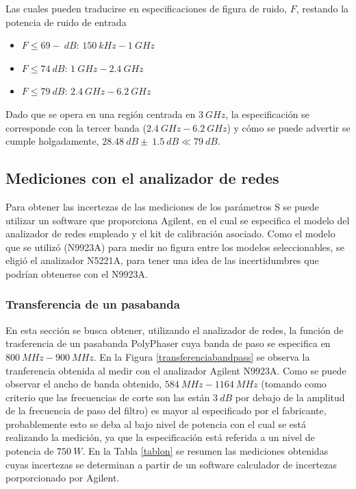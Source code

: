 \documentclass[a4paper,10pt]{article}
\begin{document}
		\indent Las cuales pueden traducirse en especificaciones de figura de 
		ruido, $F$, restando la potencia de ruido de entrada
		
		\begin{itemize}
			\item $F\leq69-~dB$: 	$150~kHz-1~GHz$
			\item $F\leq74~dB$:	 $1~GHz-2.4~GHz$
			\item $F\leq79~dB$:	 $2.4~GHz-6.2~GHz$
		\end{itemize}
		
		\indent Dado que se opera en una regi\'on centrada en $3~GHz$, la 
		especificaci\'on se corresponde con la tercer banda ($2.4~GHz-6.2~GHz$) 
		y c\'omo se puede advertir se cumple holgadamente, 
		$28.48~dB\pm~1.5~dB\ll79~dB$.
		
	\subsection{Mediciones con el analizador de redes}
	Para obtener las incertezas de las mediciones de los par\'ametros S se puede utilizar un software que proporciona Agilent, en el cual se especifica el modelo del analizador de redes empleado y el kit de calibraci\'on asociado. Como el modelo que se utiliz\'o (N9923A) para medir no figura entre los modelos seleccionables, se eligi\'o el analizador N5221A, para tener una idea de las incertidumbres que podr\'ian obtenerse con el N9923A.
		\subsubsection{Transferencia de un pasabanda}
		\indent En esta secci\'on se busca obtener, utilizando el analizador de 
		redes, la funci\'on de trasferencia de un pasabanda PolyPhaser cuya 
		banda de paso se especifica en  $800~MHz-900~MHz$. En la Figura 
		\ref{transferenciabandpass} se observa la tranferencia obtenida al 
		medir con el analizador Agilent N9923A. Como se puede observar el ancho 
		de banda obtenido, $584~MHz-1164~MHz$ (tomando como criterio que las frecuencias de corte son las est\'an $3~dB$ por debajo de la amplitud de la frecuencia de paso del filtro) es mayor al especificado por el fabricante, 
		probablemente esto se deba al bajo nivel de potencia con el cual se 
		est\'a realizando la medici\'on, ya que la especificaci\'on est\'a 
		referida a un nivel de potencia de $750~W$.
		En la Tabla \ref{tablon} se resumen las mediciones obtenidas cuyas incertezas se determinan a partir de un software calculador de incertezas porporcionado por Agilent.		
		
\end{document}
